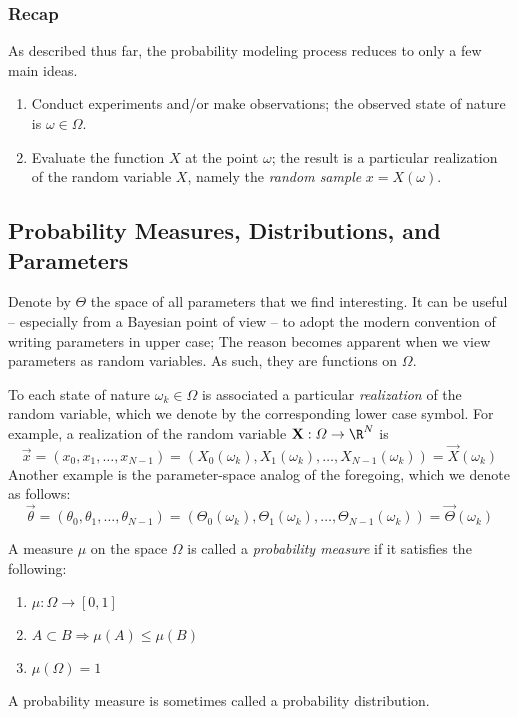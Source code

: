 \subsubsection{Recap}  As described thus far, the
probability modeling process reduces to only a few main ideas.
\begin{enumerate}
\item Conduct experiments and/or make observations; the
  observed state of nature is $\omega \in \varOmega$. 
\item Evaluate the function $X$ at the point $\omega$; the
  result is a particular realization of the random 
variable $X$, namely the \emph{random sample} $x = X(\omega)$.
\end{enumerate}

\subsection{Probability Measures, Distributions, and Parameters}
Denote by $\varTheta$ the space of all parameters that we find interesting.
It can be useful -- especially from a Bayesian point of view -- to adopt the
modern convention of writing parameters in upper case;
The reason becomes apparent when we view parameters as
random variables.  As such, they are functions on
$\varOmega$.

To each state of nature $\omega_k \in \varOmega$ is associated a 
particular \emph{realization} of the random variable, which we denote by the
corresponding lower case symbol.  For example, a realization of the random
variable $\mathbf{X} : \varOmega \to \R^N$ is
\[
\vec{x} = (x_0, x_1, \ldots, x_{N-1}) = (X_0(\omega_k), X_1(\omega_k), \ldots,
X_{N-1}(\omega_k)) = \vec{X}(\omega_k)
\]
Another example is the parameter-space analog of the
foregoing, which we denote as follows:
\[
\vec{\theta} = (\theta_0, \theta_1, \ldots, \theta_{N-1}) = (\Theta_0(\omega_k), \Theta_1(\omega_k), \ldots,
\Theta_{N-1}(\omega_k)) = \vec{\Theta}(\omega_k)
\]

A measure $\mu$ on the space $\varOmega$ is called a \emph{probability measure}
if it satisfies the following:
\begin{enumerate}
\item $\mu : \varOmega \to [0, 1]$
\item $A \subset B \Rightarrow \mu(A) \leq \mu(B)$
\item $\mu(\varOmega) = 1$
\end{enumerate}
A probability measure is sometimes called a probability distribution.

